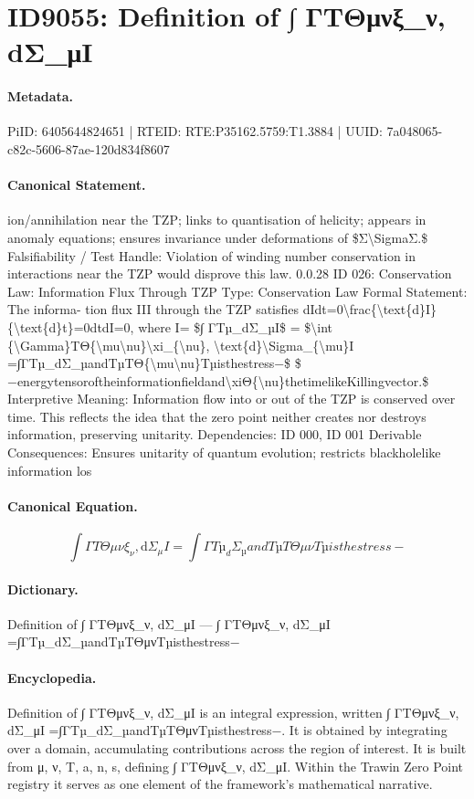\section*{ID9055: Definition of ∫ ΓTΘμνξ\_ν, dΣ\_μI}
\paragraph{Metadata.}
PiID: 6405644824651 | RTEID: RTE:P35162.5759:T1.3884 | UUID: 7a048065-c82c-5606-87ae-120d834f8607

\paragraph{Canonical Statement.}
ion/annihilation near the TZP; links to quantisation of helicity; appears in anomaly equations; ensures invariance under deformations of \$Σ\textbackslash{}SigmaΣ.\$ Falsifiability / Test Handle: Violation of winding number conservation in interactions near the TZP would disprove this law. 0.0.28 ID 026: Conservation Law: Information Flux Through TZP Type: Conservation Law Formal Statement: The informa- tion flux III through the TZP satisfies dIdt=0\textbackslash{}frac\{\textbackslash{}text\{d\}I\}\{\textbackslash{}text\{d\}t\}=0dtdI=0, where I= \$∫ ΓTµ\_dΣ\_µI\$ = \$\textbackslash{}int \{\textbackslash{}Gamma\}TΘ\{\textbackslash{}mu\textbackslash{}nu\}\textbackslash{}xi\_\{\textbackslash{}nu\}, \textbackslash{}text\{d\}\textbackslash{}Sigma\_\{\textbackslash{}mu\}I =∫ΓTµ\_dΣ\_µandTµTΘ\{\textbackslash{}mu\textbackslash{}nu\}Tµisthestress−\$ \$−energytensoroftheinformationfieldand\textbackslash{}xiΘ\{\textbackslash{}nu\}thetimelikeKillingvector.\$ Interpretive Meaning: Information flow into or out of the TZP is conserved over time. This reflects the idea that the zero point neither creates nor destroys information, preserving unitarity. Dependencies: ID 000, ID 001 Derivable Consequences: Ensures unitarity of quantum evolution; restricts blackholelike information los

\paragraph{Canonical Equation.}
\[
\int {\Gamma}TΘ{\mu\nu}\xi_{\nu}, \text{d}\Sigma_{\mu}I =∫ΓTµ_dΣ_µandTµTΘ{\mu\nu}Tµisthestress−
\]

\paragraph{Dictionary.}
Definition of ∫ ΓTΘμνξ\_ν, dΣ\_μI — ∫ ΓTΘμνξ\_ν, dΣ\_μI =∫ΓTµ\_dΣ\_µandTµTΘμνTµisthestress−

\paragraph{Encyclopedia.}
Definition of ∫ ΓTΘμνξ\_ν, dΣ\_μI is an integral expression, written ∫ ΓTΘμνξ\_ν, dΣ\_μI =∫ΓTµ\_dΣ\_µandTµTΘμνTµisthestress−. It is obtained by integrating over a domain, accumulating contributions across the region of interest. It is built from μ, ν, T, a, n, s, defining ∫ ΓTΘμνξ\_ν, dΣ\_μI. Within the Trawin Zero Point registry it serves as one element of the framework's mathematical narrative.
